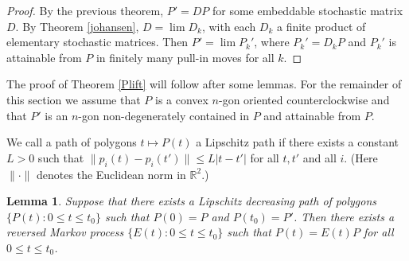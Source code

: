 \documentclass[11pt]{amsart}
\newtheorem{lemma}[theorem]{Lemma}
\theoremstyle{remark}
\numberwithin{equation}{section}
\newcommand{\R}{\mathbb{R}}
\renewcommand{\leq}{\leqslant}
\begin{document}
\begin{proof} 
By the previous theorem, $P'=DP$ for some embeddable stochastic matrix $D$. By Theorem \ref{johansen}, $D=\lim D_k$, with each $D_k$ a finite product of elementary stochastic matrices. Then $P'=\lim P_k'$, where $P_k'=D_kP$ and $P_k'$ is attainable from $P$ in finitely many pull-in moves for all $k$.
\end{proof}

The proof of Theorem \ref{Plift} will follow after some lemmas. 
For the remainder of this section we assume that $P$ is a convex $n$-gon oriented counterclockwise and that $P'$ is an $n$-gon non-degenerately contained in $P$ and attainable from $P$.  



We call a path of polygons $ t\mapsto P(t)$ a Lipschitz path if  there exists a constant $L>0$ such that $\|p_i(t)-p_i(t')\|\leq L|t-t'|$ for all $t,t'$ and all $i$. (Here $\|\cdot\|$ denotes the Euclidean norm in $\R^2$.)





\begin{lemma}\label{lipschitzpath}
Suppose that there exists a Lipschitz decreasing  path of polygons  $\{P(t):0\leq t\leq t_0\}$ such that $P(0)=P$ and $P(t_0)=P'$. Then there exists a reversed Markov process $\{E(t):0\leq t\leq t_0\}$ such that $P(t)=E(t)P$ for all $0\leq t\leq t_0$. 
\end{lemma}
\end{document}
